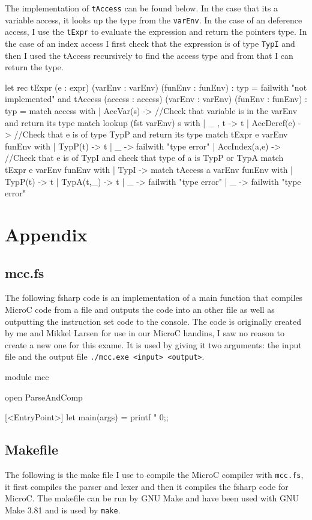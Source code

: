 The implementation of \texttt{tAccess} can be found below. In the case that its
a variable access, it looks up the type from the \texttt{varEnv}. In the case of
an deference access, I use the \texttt{tExpr} to evaluate the expression and
return the pointers type. In the case of an index access I first check that the
expression is of type \texttt{TypI} and then I used the tAccess recursively to
find the access type and from that I can return the type.
\begin{fs}
let rec tExpr (e : expr) (varEnv : varEnv) (funEnv : funEnv) : typ =
    failwith "not implemented"
and tAccess (access : access) (varEnv : varEnv) (funEnv : funEnv) : typ =
    match access with
    | AccVar(s) -> 
      //Check that variable is in the varEnv and return its type
      match lookup (fst varEnv) s with
      | _ , t -> t
    | AccDeref(e) -> 
      //Check that e is of type TypP and return its type
      match tExpr e varEnv funEnv with
      | TypP(t) -> t
      | _ -> failwith "type error"
    | AccIndex(a,e) -> 
      //Check that e is of TypI and check that type of a is TypP or TypA
      match tExpr e varEnv funEnv with
      | TypI -> 
        match tAccess a varEnv funEnv with
        | TypP(t) -> t
        | TypA(t,_) -> t
        | _ -> failwith "type error"
      | _ -> failwith "type error"
\end{fs}

\pagebreak
\section{Appendix}
\subsection{mcc.fs}
The following fsharp code is an implementation of a main function that compiles
MicroC code from a file and outputs the code into an other file as well as
outputting the instruction set code to the console. The code is originally
created by me and Mikkel Larsen for use in our MicroC handins, I saw no reason
to create a new one for this exame. It is used by giving it two arguments: the
input file and the output file \texttt{./mcc.exe <input> <output>}. 
\begin{fs}
module mcc

open ParseAndComp

[<EntryPoint>]
let main(args) =
    printf "%
    0;;
\end{fs}
\subsection{Makefile}
The following is the make file I use to compile the MicroC compiler with
\texttt{mcc.fs}, it first compiles the parser and lexer and then it compiles the
fsharp code for MicroC.  The makefile can be run by GNU Make and have been used
with GNU Make 3.81 and is used by \texttt{make}.

